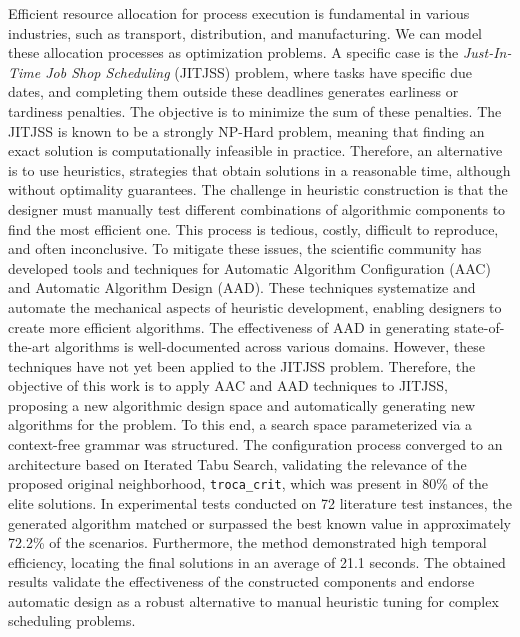 Efficient resource allocation for process execution is fundamental in various industries, such as transport, distribution, and manufacturing. We can model these allocation processes as optimization problems. A specific case is the \textit{Just-In-Time Job Shop Scheduling} (JITJSS) problem, where tasks have specific due dates, and completing them outside these deadlines generates earliness or tardiness penalties. The objective is to minimize the sum of these penalties. The JITJSS is known to be a strongly NP-Hard problem, meaning that finding an exact solution is computationally infeasible in practice. Therefore, an alternative is to use heuristics, strategies that obtain solutions in a reasonable time, although without optimality guarantees. The challenge in heuristic construction is that the designer must manually test different combinations of algorithmic components to find the most efficient one. This process is tedious, costly, difficult to reproduce, and often inconclusive. To mitigate these issues, the scientific community has developed tools and techniques for Automatic Algorithm Configuration (AAC) and Automatic Algorithm Design (AAD). These techniques systematize and automate the mechanical aspects of heuristic development, enabling designers to create more efficient algorithms. The effectiveness of AAD in generating state-of-the-art algorithms is well-documented across various domains. However, these techniques have not yet been applied to the JITJSS problem. Therefore, the objective of this work is to apply AAC and AAD techniques to JITJSS, proposing a new algorithmic design space and automatically generating new algorithms for the problem. To this end, a search space parameterized via a context-free grammar was structured. The configuration process converged to an architecture based on Iterated Tabu Search, validating the relevance of the proposed original neighborhood, \texttt{troca\_crit}, which was present in 80\% of the elite solutions. In experimental tests conducted on 72 literature test instances, the generated algorithm matched or surpassed the best known value in approximately 72.2\% of the scenarios. Furthermore, the method demonstrated high temporal efficiency, locating the final solutions in an average of 21.1 seconds. The obtained results validate the effectiveness of the constructed components and endorse automatic design as a robust alternative to manual heuristic tuning for complex scheduling problems.

